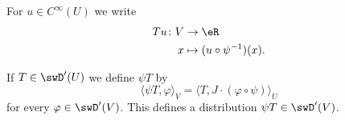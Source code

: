 For \( u\in  C^{\infty}(U)\) we write
\begin{equation}        \label{EQooHSVBooIZRxzh}
    \begin{aligned}
        Tu\colon V&\to \eR \\
        x&\mapsto (u\circ \psi^{-1})(x). 
    \end{aligned}
\end{equation}

\begin{propositionDef}
If \( T\in \swD'(U)\) we define \( \psi T\) by
\begin{equation}
    \langle \psi T, \varphi\rangle_V=\langle T, J\cdot(\varphi\circ \psi)\rangle_U
\end{equation}
for every \( \varphi\in\swD'(V)\). This defines a distribution \( \psi T\in \swD'(V)\).
\end{propositionDef}

